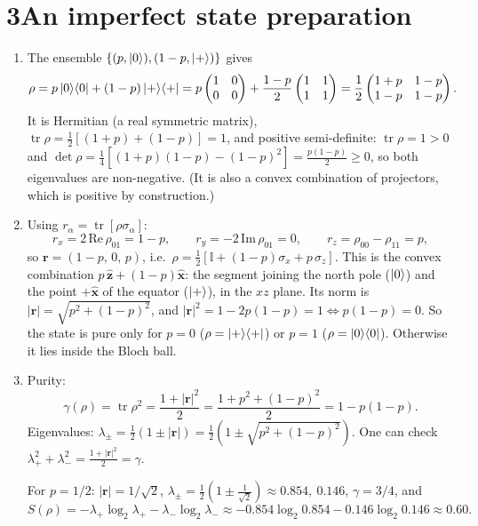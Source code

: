 \documentclass[11pt,a4paper]{article}
\newcommand{\tr}{\operatorname{tr}}
\newcommand{\id}{\mathbb{I}}
\begin{document}
\section*{3\quad An imperfect state preparation}

\begin{enumerate}
\item The ensemble $\{(p,\ket0),(1-p,\ket+)\}$ gives
\[
\rho=p\ket0\!\bra0+(1-p)\ket+\!\bra+
= p\begin{pmatrix}1&0\\0&0\end{pmatrix}+\frac{1-p}{2}\begin{pmatrix}1&1\\1&1\end{pmatrix}
=\frac12\begin{pmatrix}1+p&1-p\\1-p&1-p\end{pmatrix}.
\]
It is Hermitian (a real symmetric matrix), $\tr\rho=\frac12[(1+p)+(1-p)]=1$, and positive
semi-definite: $\tr\rho=1>0$ and $\det\rho=\frac14[(1+p)(1-p)-(1-p)^2]=\frac{p(1-p)}{2}\ge0$, so both
eigenvalues are non-negative. (It is also a convex combination of projectors, which is positive by construction.)

\item Using $r_\alpha=\tr[\rho\sigma_\alpha]$:
\[
r_x=2\,\mathrm{Re}\,\rho_{01}=1-p,\qquad r_y=-2\,\mathrm{Im}\,\rho_{01}=0,\qquad r_z=\rho_{00}-\rho_{11}=p,
\]
so $\bm r=(1-p,\,0,\,p)$, i.e.\ $\rho=\frac12\left[\id+(1-p)\sigma_x+p\,\sigma_z\right]$. This is
the convex combination $p\,\hat{\bm z}+(1-p)\hat{\bm x}$: the segment joining the north pole
($\ket0$) and the point $+\hat{\bm x}$ of the equator ($\ket+$), in the $xz$ plane. Its norm is
$|\bm r|=\sqrt{p^2+(1-p)^2}$, and $|\bm r|^2=1-2p(1-p)=1\iff p(1-p)=0$. So the state is pure only
for $p=0$ ($\rho=\ket+\!\bra+$) or $p=1$ ($\rho=\ket0\!\bra0$). Otherwise it lies inside the Bloch ball.

\item Purity:
\[
\gamma(\rho)=\tr\rho^2=\frac{1+|\bm r|^2}{2}=\frac{1+p^2+(1-p)^2}{2}=1-p(1-p).
\]
Eigenvalues: $\lambda_\pm=\frac12(1\pm|\bm r|)=\frac12\left(1\pm\sqrt{p^2+(1-p)^2}\right)$. One can
check $\lambda_+^2+\lambda_-^2=\frac{1+|\bm r|^2}{2}=\gamma$.

For $p=1/2$: $|\bm r|=1/\sqrt2$, $\lambda_\pm=\frac12\left(1\pm\frac1{\sqrt2}\right)\approx0.854,\ 0.146$, $\gamma=3/4$, and
\[
S(\rho)=-\lambda_+\log_2\lambda_+-\lambda_-\log_2\lambda_-\approx-0.854\log_2 0.854-0.146\log_2 0.146\approx0.60 .
\]


\end{enumerate}
\end{document}
